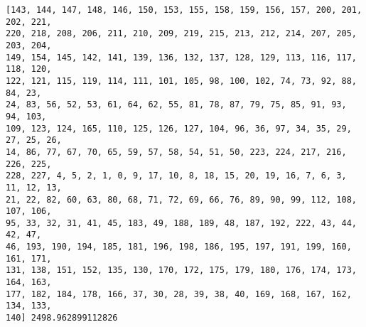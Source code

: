 \documentclass[11pt]{article}
\begin{document}
    \begin{Verbatim}[commandchars=\\\{\}]
[143, 144, 147, 148, 146, 150, 153, 155, 158, 159, 156, 157, 200, 201, 202, 221,
220, 218, 208, 206, 211, 210, 209, 219, 215, 213, 212, 214, 207, 205, 203, 204,
149, 154, 145, 142, 141, 139, 136, 132, 137, 128, 129, 113, 116, 117, 118, 120,
122, 121, 115, 119, 114, 111, 101, 105, 98, 100, 102, 74, 73, 92, 88, 84, 23,
24, 83, 56, 52, 53, 61, 64, 62, 55, 81, 78, 87, 79, 75, 85, 91, 93, 94, 103,
109, 123, 124, 165, 110, 125, 126, 127, 104, 96, 36, 97, 34, 35, 29, 27, 25, 26,
14, 86, 77, 67, 70, 65, 59, 57, 58, 54, 51, 50, 223, 224, 217, 216, 226, 225,
228, 227, 4, 5, 2, 1, 0, 9, 17, 10, 8, 18, 15, 20, 19, 16, 7, 6, 3, 11, 12, 13,
21, 22, 82, 60, 63, 80, 68, 71, 72, 69, 66, 76, 89, 90, 99, 112, 108, 107, 106,
95, 33, 32, 31, 41, 45, 183, 49, 188, 189, 48, 187, 192, 222, 43, 44, 42, 47,
46, 193, 190, 194, 185, 181, 196, 198, 186, 195, 197, 191, 199, 160, 161, 171,
131, 138, 151, 152, 135, 130, 170, 172, 175, 179, 180, 176, 174, 173, 164, 163,
177, 182, 184, 178, 166, 37, 30, 28, 39, 38, 40, 169, 168, 167, 162, 134, 133,
140] 2498.962899112826
    \end{Verbatim}

    \begin{center}
    \end{center}
    { \hspace*{\fill} \\}
    

    
    
    
\end{document}
